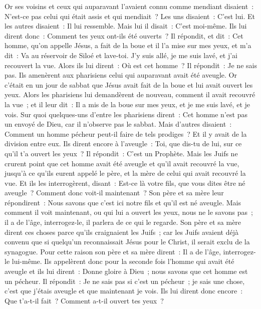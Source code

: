 \begin{multicols}{2}
Or ses voisins et ceux qui auparavant l'avaient connu comme mendiant disaient~: N'est-ce pas celui qui était assis et qui mendiait~?
Les uns disaient~: C'est lui. Et les autres disaient~: Il lui ressemble. Mais lui il disait~: C'est moi-même.
Ils lui dirent donc~: Comment tes yeux ont-ils été ouverts~?
Il répondit, et dit~: Cet homme, qu'on appelle Jésus, a fait de la boue et il l'a mise sur mes yeux, et m'a dit~: Va au réservoir de Siloé et lave-toi. J'y suis allé, je me suis lavé, et j'ai recouvert la vue.
Alors ils lui dirent~: Où est cet homme~? Il répondit~: Je ne sais pas.
Ils amenèrent aux pharisiens celui qui auparavant avait été aveugle.
Or c'était en un jour de sabbat que Jésus avait fait de la boue et lui avait ouvert les yeux.
Alors les pharisiens lui demandèrent de nouveau, comment il avait recouvré la vue~; et il leur dit~: Il a mis de la boue sur mes yeux, et je me suis lavé, et je vois.
Sur quoi quelques-uns d'entre les pharisiens dirent~: Cet homme n'est pas un envoyé de Dieu, car il n'observe pas le sabbat. Mais d'autres disaient~: Comment un homme pécheur peut-il faire de tels prodiges~? Et il y avait de la division entre eux.
Ils dirent encore à l'aveugle~: Toi, que dis-tu de lui, sur ce qu'il t'a ouvert les yeux~? Il répondit~: C'est un Prophète.
Mais les Juifs ne crurent point que cet homme avait été aveugle et qu'il avait recouvré la vue, jusqu'à ce qu'ils eurent appelé le père, et la mère de celui qui avait recouvré la vue.
Et ils les interrogèrent, disant~: Est-ce là votre fils, que vous dites être né aveugle~? Comment donc voit-il maintenant~?
Son père et sa mère leur répondirent~: Nous savons que c'est ici notre fils et qu'il est né aveugle.
Mais comment il voit maintenant, ou qui lui a ouvert les yeux, nous ne le savons pas~; il a de l'âge, interrogez-le, il parlera de ce qui le regarde.
Son père et sa mère dirent ces choses parce qu'ils craignaient les Juifs~; car les Juifs avaient déjà convenu que si quelqu'un reconnaissait Jésus pour le Christ, il serait exclu de la synagogue.
Pour cette raison son père et sa mère dirent~: Il a de l'âge, interrogez-le lui-même.
Ils appelèrent donc pour la seconde fois l'homme qui avait été aveugle et ils lui dirent~: Donne gloire à Dieu~; nous savons que cet homme est un pécheur.
Il répondit~: Je ne sais pas si c'est un pécheur~; je sais une chose, c'est que j'étais aveugle et que maintenant je vois.
Ils lui dirent donc encore~: Que t'a-t-il fait~? Comment a-t-il ouvert tes yeux~?

\end{multicols}
